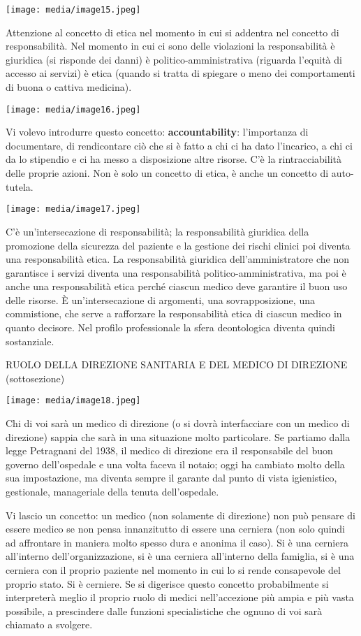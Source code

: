 \documentclass[]{article}
\begin{document}
\texttt{[image: media/image15.jpeg]}

Attenzione al concetto di etica nel momento in cui si addentra nel
concetto di responsabilità. Nel momento in cui ci sono delle violazioni
la responsabilità è giuridica (si risponde dei danni) è
politico-amministrativa (riguarda l'equità di accesso ai servizi) è
etica (quando si tratta di spiegare o meno dei comportamenti di buona o
cattiva medicina).

\texttt{[image: media/image16.jpeg]}

Vi volevo introdurre questo concetto: \textbf{accountability}:
l'importanza di documentare, di rendicontare ciò che si è fatto a chi ci
ha dato l'incarico, a chi ci da lo stipendio e ci ha messo a
disposizione altre risorse. C'è la rintracciabilità delle proprie
azioni. Non è solo un concetto di etica, è anche un concetto di
auto-tutela.

\texttt{[image: media/image17.jpeg]}

C'è un'intersecazione di responsabilità; la responsabilità giuridica
della promozione della sicurezza del paziente e la gestione dei rischi
clinici poi diventa una responsabilità etica. La responsabilità
giuridica dell'amministratore che non garantisce i servizi diventa una
responsabilità politico-amministrativa, ma poi è anche una
responsabilità etica perché ciascun medico deve garantire il buon uso
delle risorse. È un'intersecazione di argomenti, una sovrapposizione,
una commistione, che serve a rafforzare la responsabilità etica di
ciascun medico in quanto decisore. Nel profilo professionale la sfera
deontologica diventa quindi sostanziale.

RUOLO DELLA DIREZIONE SANITARIA E DEL MEDICO DI DIREZIONE (sottosezione)

\texttt{[image: media/image18.jpeg]}

Chi di voi sarà un medico di direzione (o si dovrà interfacciare con un
medico di direzione) sappia che sarà in una situazione molto
particolare. Se partiamo dalla legge Petragnani del 1938, il medico di
direzione era il responsabile del buon governo dell'ospedale e una volta
faceva il notaio; oggi ha cambiato molto della sua impostazione, ma
diventa sempre il garante dal punto di vista igienistico, gestionale,
manageriale della tenuta dell'ospedale.

Vi lascio un concetto: un medico (non solamente di direzione) non può
pensare di essere medico se non pensa innanzitutto di essere una
cerniera (non solo quindi ad affrontare in maniera molto spesso dura e
anonima il caso). Si è una cerniera all'interno dell'organizzazione, si
è una cerniera all'interno della famiglia, si è una cerniera con il
proprio paziente nel momento in cui lo si rende consapevole del proprio
stato. Si è cerniere. Se si digerisce questo concetto probabilmente si
interpreterà meglio il proprio ruolo di medici nell'accezione più ampia
e più vasta possibile, a prescindere dalle funzioni specialistiche che
ognuno di voi sarà chiamato a svolgere.
\end{document}

